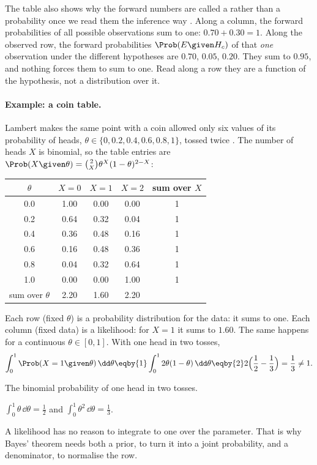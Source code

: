 The table also shows why the forward numbers are called a
 rather than a probability once we read them the inference
way . Along a column, the forward probabilities of all
possible observations sum to one: $0.70+0.30=1$. Along the observed row, the
forward probabilities $\Prob(E\given H_c)$ of that \emph{one} observation under the
different hypotheses are $0.70$, $0.05$, $0.20$. They sum to $0.95$, and nothing
forces them to sum to one. Read along a row they are a function of the
hypothesis, not a distribution over it.

\paragraph{Example: a coin table.}
Lambert makes the same point with a coin allowed only six values of its
probability of heads, $\theta\in\{0,0.2,0.4,0.6,0.8,1\}$, tossed twice
. The number of heads $X$ is binomial, so the
table entries are $\Prob(X\given\theta)=\binom{2}{X}\theta^X(1-\theta)^{2-X}$:
\begin{center}
\small
\begin{tabular}{@{}c|ccc|c@{}}
\toprule
$\theta$ & $X=0$ & $X=1$ & $X=2$ & sum over $X$\\
\midrule
0.0 & 1.00 & 0.00 & 0.00 & 1\\
0.2 & 0.64 & 0.32 & 0.04 & 1\\
0.4 & 0.36 & 0.48 & 0.16 & 1\\
0.6 & 0.16 & 0.48 & 0.36 & 1\\
0.8 & 0.04 & 0.32 & 0.64 & 1\\
1.0 & 0.00 & 0.00 & 1.00 & 1\\
\midrule
sum over $\theta$ & 2.20 & 1.60 & 2.20 & \\
\bottomrule
\end{tabular}
\end{center}
Each row (fixed $\theta$) is a probability distribution for the data: it sums to
one. Each column (fixed data) is a likelihood: for $X=1$ it sums to $1.60$. The
same happens for a continuous $\theta\in[0,1]$. With one head in two tosses,
\begin{align*}
  \int_0^1\Prob(X=1\given\theta)\,\dd\theta
  \eqby{1}\int_0^1 2\theta(1-\theta)\,\dd\theta
  \eqby{2}2\Bigl(\frac12-\frac13\Bigr)=\frac13\neq1 .
\end{align*}
\begin{explain}
  \item The binomial probability of one head in two tosses.
  \item $\int_0^1\theta\,\dd\theta=\frac12$ and $\int_0^1\theta^2\,\dd\theta=\frac13$.
\end{explain}
A likelihood has no reason to integrate to one over the parameter. That is why
Bayes' theorem needs both a prior, to turn it into a joint probability, and a
denominator, to normalise the row.

